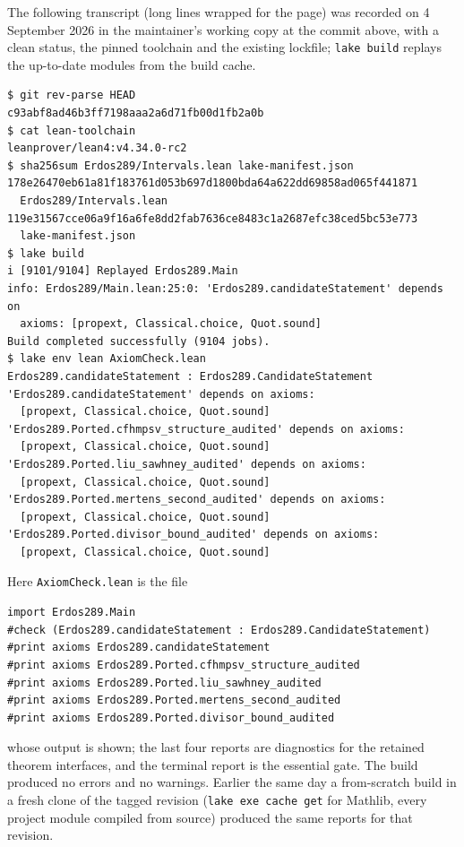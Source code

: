 \documentclass[11pt,letterpaper]{article}
\numberwithin{equation}{section}
\theoremstyle{plain}
\theoremstyle{remark}
\begin{document}
The following transcript (long lines wrapped for the page) was recorded on 4 September 2026 in the maintainer's working copy at the commit above, with a clean status, the pinned toolchain and the existing lockfile; \texttt{lake build} replays the up-to-date modules from the build cache.
\begin{verbatim}
$ git rev-parse HEAD
c93abf8ad46b3ff7198aaa2a6d71fb00d1fb2a0b
$ cat lean-toolchain
leanprover/lean4:v4.34.0-rc2
$ sha256sum Erdos289/Intervals.lean lake-manifest.json
178e26470eb61a81f183761d053b697d1800bda64a622dd69858ad065f441871
  Erdos289/Intervals.lean
119e31567cce06a9f16a6fe8dd2fab7636ce8483c1a2687efc38ced5bc53e773
  lake-manifest.json
$ lake build
i [9101/9104] Replayed Erdos289.Main
info: Erdos289/Main.lean:25:0: 'Erdos289.candidateStatement' depends on
  axioms: [propext, Classical.choice, Quot.sound]
Build completed successfully (9104 jobs).
$ lake env lean AxiomCheck.lean
Erdos289.candidateStatement : Erdos289.CandidateStatement
'Erdos289.candidateStatement' depends on axioms:
  [propext, Classical.choice, Quot.sound]
'Erdos289.Ported.cfhmpsv_structure_audited' depends on axioms:
  [propext, Classical.choice, Quot.sound]
'Erdos289.Ported.liu_sawhney_audited' depends on axioms:
  [propext, Classical.choice, Quot.sound]
'Erdos289.Ported.mertens_second_audited' depends on axioms:
  [propext, Classical.choice, Quot.sound]
'Erdos289.Ported.divisor_bound_audited' depends on axioms:
  [propext, Classical.choice, Quot.sound]
\end{verbatim}
Here \texttt{AxiomCheck.lean} is the file
\begin{verbatim}
import Erdos289.Main
#check (Erdos289.candidateStatement : Erdos289.CandidateStatement)
#print axioms Erdos289.candidateStatement
#print axioms Erdos289.Ported.cfhmpsv_structure_audited
#print axioms Erdos289.Ported.liu_sawhney_audited
#print axioms Erdos289.Ported.mertens_second_audited
#print axioms Erdos289.Ported.divisor_bound_audited
\end{verbatim}
whose output is shown; the last four reports are diagnostics for the retained theorem interfaces, and the terminal report is the essential gate. The build produced no errors and no warnings. Earlier the same day a from-scratch build in a fresh clone of the tagged revision (\texttt{lake exe cache get} for Mathlib, every project module compiled from source) produced the same reports for that revision.
\end{document}
